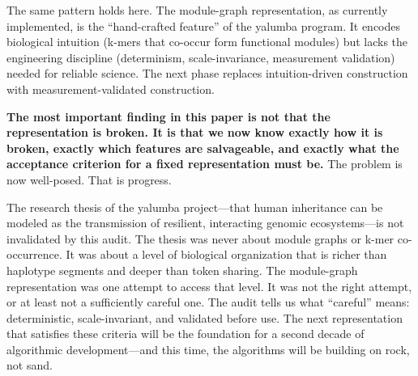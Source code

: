 \documentclass{../yalumba}
\begin{document}
The same pattern holds here.  The module-graph representation, as
currently implemented, is the ``hand-crafted feature'' of the yalumba
program.  It encodes biological intuition (k-mers that co-occur form
functional modules) but lacks the engineering discipline (determinism,
scale-invariance, measurement validation) needed for reliable
science.  The next phase replaces intuition-driven construction with
measurement-validated construction.

\vspace{1em}

\begin{keyfinding}
\textbf{The most important finding in this paper is not that the
representation is broken.  It is that we now know exactly how it is
broken, exactly which features are salvageable, and exactly what the
acceptance criterion for a fixed representation must be.}  The problem
is now well-posed.  That is progress.
\end{keyfinding}

\vspace{0.5em}

The research thesis of the yalumba project---that human inheritance can
be modeled as the transmission of resilient, interacting genomic
ecosystems---is not invalidated by this audit.  The thesis was never
about module graphs or k-mer co-occurrence.  It was about a level of
biological organization that is richer than haplotype segments and
deeper than token sharing.  The module-graph representation was one
attempt to access that level.  It was not the right attempt, or at
least not a sufficiently careful one.  The audit tells us what ``careful''
means: deterministic, scale-invariant, and validated before use.  The
next representation that satisfies these criteria will be the foundation
for a second decade of algorithmic development---and this time, the
algorithms will be building on rock, not sand.




\end{document}
